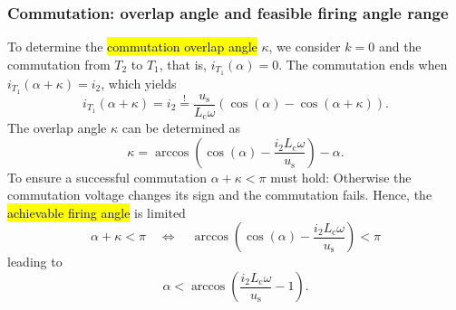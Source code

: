 \begin{frame}[c]
    \frametitle{Commutation: overlap angle and feasible firing angle range}
    To determine the \hl{commutation overlap angle} $\kappa$, we consider $k=0$ and the commutation from $T_2$ to $T_1$, that is, $i_{T_1}(\alpha) = 0$. The commutation ends when $i_{T_1}(\alpha+\kappa) = i_2$, which yields
    \begin{equation}
        i_{T_1}(\alpha+\kappa) = i_2 \stackrel{!}{=} \frac{u_\mathrm{s}}{L_\mathrm{c}\omega}\left(\cos(\alpha)-\cos(\alpha+\kappa)\right).
    \end{equation}
    The overlap angle $\kappa$ can be determined as
    \begin{equation}
        \kappa = \arccos\left(\cos(\alpha) - \frac{i_2L_\mathrm{c}\omega}{u_\mathrm{s}}\right) - \alpha.
        \label{eq:overlap_angle_M2C}
    \end{equation}
    To ensure a successful commutation $\alpha+\kappa < \pi$ must hold: Otherwise the commutation voltage changes its sign and the commutation fails. Hence, the \hl{achievable firing angle} is limited
    \begin{equation}
        \alpha + \kappa  < \pi \quad \Leftrightarrow \quad \arccos\left(\cos(\alpha) - \frac{i_2L_\mathrm{c}\omega}{u_\mathrm{s}}\right) < \pi 
    \end{equation}
    leading to 
    \begin{equation}
        \alpha < \arccos\left( \frac{i_2L_\mathrm{c}\omega}{u_\mathrm{s}} - 1\right).
    \end{equation}
\end{frame}

